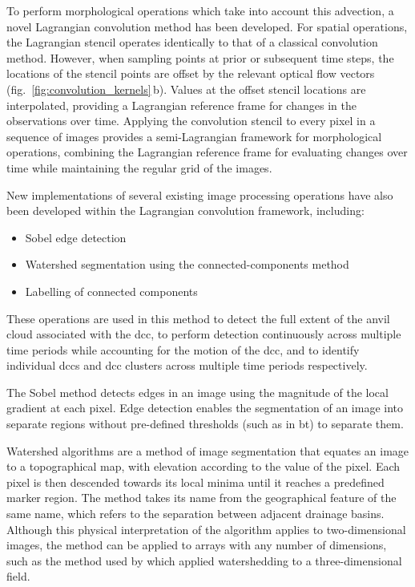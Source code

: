 To perform morphological operations which take into account this advection, a novel Lagrangian convolution method has been developed.
For spatial operations, the Lagrangian stencil operates identically to that of a classical convolution method.
However, when sampling points at prior or subsequent time steps, the locations of the stencil points are offset by the relevant optical flow vectors (fig.~\ref{fig:convolution_kernels}\,b).
Values at the offset stencil locations are interpolated, providing a Lagrangian reference frame for changes in the observations over time.
Applying the convolution stencil to every pixel in a sequence of images provides a semi-Lagrangian framework for morphological operations, combining the Lagrangian reference frame for evaluating changes over time while maintaining the regular grid of the images.

New implementations of several existing image processing operations have also been developed within the Lagrangian convolution framework, including:
\begin{itemize}
    \item Sobel edge detection \citep{sobel_isotropic_2014}
    \item Watershed segmentation using the connected-components method \citep{bieniek_efficient_2000}
    \item Labelling of connected components \citep{hoshen_percolation_1976}
\end{itemize}

These operations are used in this method to detect the full extent of the anvil cloud associated with the \acrshort{dcc}, to perform detection continuously across multiple time periods while accounting for the motion of the \acrshort{dcc}, and to identify individual \acrshort{dcc}s and \acrshort{dcc} clusters across multiple time periods respectively.

The Sobel method detects edges in an image using the magnitude of the local gradient at each pixel.
Edge detection enables the segmentation of an image into separate regions without pre-defined thresholds (such as in \acrshort{bt}) to separate them.

Watershed algorithms are a method of image segmentation that equates an image to a topographical map, with elevation according to the value of the pixel.
Each pixel is then descended towards its local minima until it reaches a predefined marker region.
The method takes its name from the geographical feature of the same name, which refers to the separation between adjacent drainage basins.
Although this physical interpretation of the algorithm applies to two-dimensional images, the method can be applied to arrays with any number of dimensions, such as the method used by \citet{fiolleau_algorithm_2013} which applied watershedding to a three-dimensional field.

